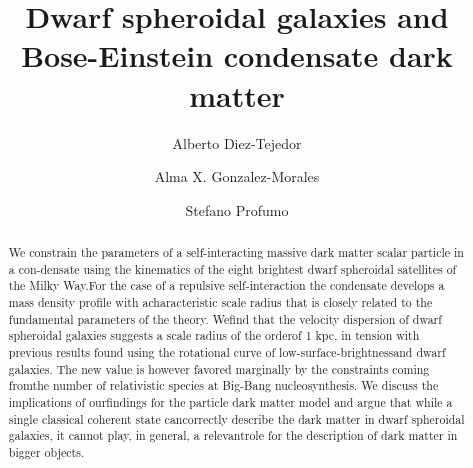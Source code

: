 \documentclass{article}
\title{\textbf{Dwarf spheroidal galaxies and Bose-Einstein condensate dark matter}}
\author[1]{Alberto Diez-Tejedor}
\author[2]{Alma X. Gonzalez-Morales}
\author[3]{Stefano Profumo}
\affil {Santa Cruz Institute for Particle Physics and Department of Physics,University of California, Santa Cruz, CA, 95064, USA}
\begin{document}
\maketitle
\begin{abstract}
We constrain the parameters of a self-interacting massive dark matter scalar particle in a con-densate  using  the  kinematics  of  the  eight  brightest  dwarf  spheroidal  satellites  of  the  Milky  Way.For  the case  of a  repulsive  self-interaction  the condensate  develops  a mass  density  profile with  acharacteristic scale radius that is closely related to the fundamental parameters of the theory.  Wefind that the velocity dispersion of dwarf spheroidal galaxies suggests a scale radius of the orderof 1 kpc, in tension with previous results found using the rotational curve of low-surface-brightnessand dwarf galaxies.  The new value is however favored marginally by the constraints coming fromthe number of relativistic species at Big-Bang nucleosynthesis.  We discuss the implications of ourfindings for the particle dark matter model and argue that while a single classical coherent state cancorrectly describe the dark matter in dwarf spheroidal galaxies, it cannot play, in general, a relevantrole for the description of dark matter in bigger objects.
\end{abstract}
\end{document}
